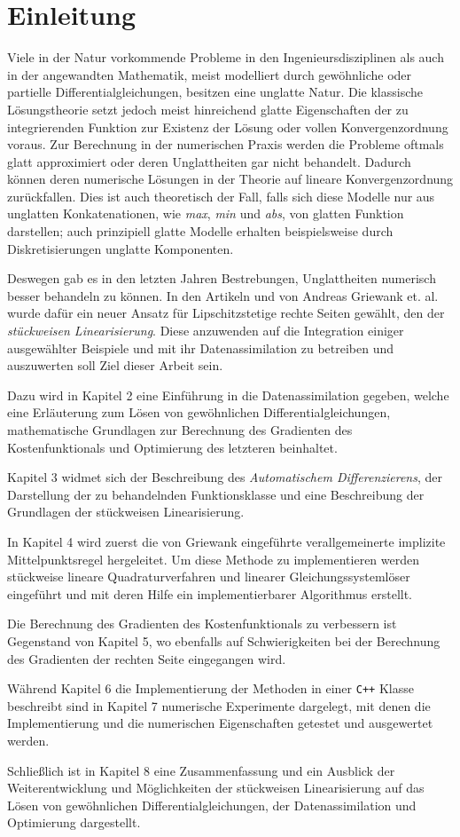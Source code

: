 \chapter{Einleitung}
Viele in der Natur vorkommende Probleme in den Ingenieursdisziplinen als auch in der angewandten Mathematik, meist modelliert durch gewöhnliche oder partielle Differentialgleichungen, besitzen eine unglatte Natur. Die klassische Lösungstheorie setzt jedoch meist hinreichend glatte Eigenschaften der zu integrierenden Funktion zur Existenz der Lösung oder vollen Konvergenzordnung voraus. Zur Berechnung in der numerischen Praxis werden die Probleme oftmals glatt approximiert oder deren Unglattheiten gar nicht behandelt. Dadurch können deren numerische Lösungen in der Theorie auf lineare Konvergenzordnung zurückfallen. Dies ist auch theoretisch der Fall, falls sich diese Modelle nur aus unglatten Konkatenationen, wie \textit{max}, \textit{min} und \textit{abs}, von glatten Funktion darstellen; auch prinzipiell glatte Modelle erhalten beispielsweise durch Diskretisierungen unglatte Komponenten.

Deswegen gab es in den letzten Jahren Bestrebungen, Unglattheiten numerisch besser behandeln zu können. In den Artikeln \cite{monster} und \cite{plan} von Andreas Griewank et. al. wurde dafür ein neuer Ansatz für Lipschitzstetige rechte Seiten gewählt, den der \textit{stückweisen Linearisierung}. Diese anzuwenden auf die Integration einiger ausgewählter Beispiele und mit ihr Datenassimilation zu betreiben und auszuwerten soll Ziel dieser Arbeit sein.

Dazu wird in Kapitel 2 eine Einführung in die Datenassimilation gegeben, welche eine Erläuterung zum Lösen von gewöhnlichen Differentialgleichungen, mathematische Grundlagen zur Berechnung des Gradienten des Kostenfunktionals und Optimierung des letzteren beinhaltet.

Kapitel 3 widmet sich der Beschreibung des \textit{Automatischem Differenzierens}, der Darstellung der zu behandelnden Funktionsklasse und eine Beschreibung der Grundlagen der stückweisen Linearisierung.

In Kapitel 4 wird zuerst die von Griewank eingeführte verallgemeinerte implizite Mittelpunktsregel hergeleitet. Um diese Methode zu implementieren werden stückweise lineare Quadraturverfahren und linearer Gleichungssystemlöser eingeführt und mit deren Hilfe ein implementierbarer Algorithmus erstellt.

Die Berechnung des Gradienten des Kostenfunktionals zu verbessern ist Gegenstand von Kapitel 5, wo ebenfalls auf Schwierigkeiten bei der Berechnung des Gradienten der rechten Seite eingegangen wird. 

Während Kapitel 6 die Implementierung der Methoden in einer \texttt{C++} Klasse beschreibt sind in Kapitel 7 numerische Experimente dargelegt, mit denen die Implementierung und die numerischen Eigenschaften getestet und ausgewertet werden.

Schließlich ist in Kapitel 8 eine Zusammenfassung und ein Ausblick der Weiterentwicklung und Möglichkeiten der stückweisen Linearisierung auf das Lösen von gewöhnlichen Differentialgleichungen, der Datenassimilation und Optimierung dargestellt.